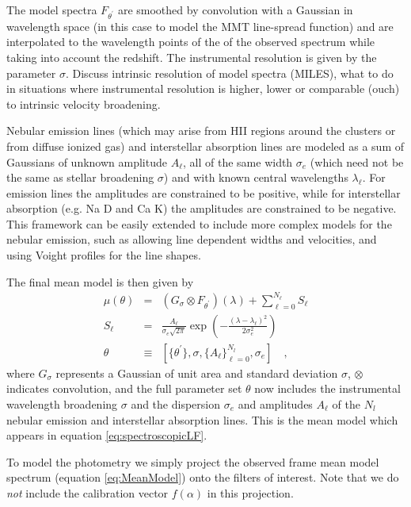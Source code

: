 \documentclass[iop,numberedappendix]{emulateapj}
\begin{document}
The model spectra $F_{\theta^\prime}$ are smoothed by convolution
with a Gaussian in wavelength space (in this case to model the MMT
line-spread function) and are interpolated to the wavelength points of
the of the observed spectrum while taking into account the
redshift. The instrumental resolution is given by the parameter
$\sigma$.  {\color{blue}Discuss intrinsic resolution of model spectra
(MILES), what to do in situations where instrumental resolution is
higher, lower or comparable (ouch) to intrinsic velocity broadening.}

Nebular emission lines (which may arise from HII regions around the
clusters or from diffuse ionized gas) and interstellar absorption
lines are modeled as a sum of Gaussians of unknown amplitude $A_\ell$,
all of the same width $\sigma_e$ (which need not be the same as
stellar broadening $\sigma$) and with known central wavelengths
$\lambda_\ell$.  For emission lines the amplitudes are constrained to
be positive, while for interstellar absorption (e.g. Na D and Ca K)
the amplitudes are constrained to be negative. This framework can be
easily extended to include more complex models for the nebular
emission, such as allowing line dependent widths and velocities, and
using Voight profiles for the line shapes.  

The final mean model is then given by 
\begin{eqnarray}\label{eq:MeanModel} 
\mu(\theta) &  = & (G_\sigma  \otimes F_{\theta^\prime})(\lambda) +
\sum_{\ell=0}^{N_\ell} S_\ell \\
S_\ell & = & \frac{A_\ell}{\sigma_e\sqrt{2\pi}} \exp(-\frac{(\lambda -
 \lambda_\ell)^2}{2\sigma_e^2})\\
\theta & \equiv & \left[ \{\theta^\prime\}, \sigma, \{A_\ell\}_{\ell=0}^{N_l},
  \sigma_e \right]
\quad ,
\end{eqnarray}
where $G_\sigma$ represents a Gaussian of unit area 
and standard deviation $\sigma$, 
$\otimes$ indicates convolution, 
and the full parameter set $\theta$ now includes
the instrumental wavelength broadening $\sigma$ 
and the dispersion $\sigma_e$ and
amplitudes $A_\ell$ of the $N_l$ nebular emission and interstellar
absorption lines.
This is the mean model which appears in equation
\ref{eq:spectroscopicLF}.

To model the photometry we simply project the observed frame mean
model spectrum (equation \ref{eq:MeanModel}) onto the filters of
interest.  Note that we do \emph{not} include the calibration vector
$f(\alpha)$ in this projection.
\end{document}
